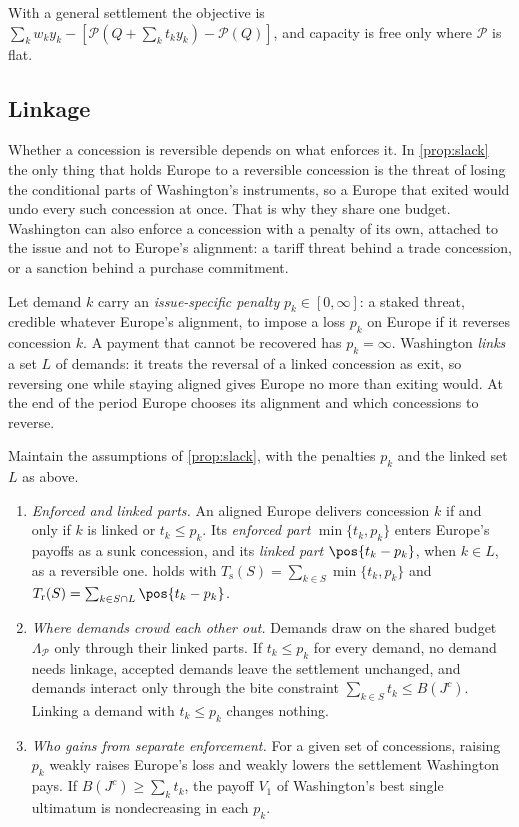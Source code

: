 With a general settlement the objective is $\sum_k w_ky_k-[\mathcal P(Q+\sum_kt_ky_k)-\mathcal P(Q)]$, and capacity is free only where $\mathcal P$ is flat.

\subsection{Linkage}\label{sec:linkage}

Whether a concession is reversible depends on what enforces it. In \cref{prop:slack} the only thing that holds Europe to a reversible concession is the threat of losing the conditional parts of Washington's instruments, so a Europe that exited would undo every such concession at once. That is why they share one budget. Washington can also enforce a concession with a penalty of its own, attached to the issue and not to Europe's alignment: a tariff threat behind a trade concession, or a sanction behind a purchase commitment.

Let demand $k$ carry an \emph{issue-specific penalty} $p_k\in[0,\infty]$: a staked threat, credible whatever Europe's alignment, to impose a loss $p_k$ on Europe if it reverses concession $k$. A payment that cannot be recovered has $p_k=\infty$. Washington \emph{links} a set $L$ of demands: it treats the reversal of a linked concession as exit, so reversing one while staying aligned gives Europe no more than exiting would. At the end of the period Europe chooses its alignment and which concessions to reverse.

\begin{proposition}[Linkage]\label{prop:linkage}
Maintain the assumptions of \cref{prop:slack}, with the penalties $p_k$ and the linked set $L$ as above.
\begin{enumerate}[label=(\alph*)]
\item \emph{Enforced and linked parts.} An aligned Europe delivers concession $k$ if and only if $k$ is linked or $t_k\le p_k$. Its \emph{enforced part} $\min\{t_k,p_k\}$ enters Europe's payoffs as a sunk concession, and its \emph{linked part} $\pos{t_k-p_k}$, when $k\in L$, as a reversible one.  holds with $T_{\mathrm s}(S)=\sum_{k\in S}\min\{t_k,p_k\}$ and $T_{\mathrm r}(S)=\sum_{k\in S\cap L}\pos{t_k-p_k}$.
\item \emph{Where demands crowd each other out.} Demands draw on the shared budget $\Lambda_{\mathcal P}$ only through their linked parts. If $t_k\le p_k$ for every demand, no demand needs linkage, accepted demands leave the settlement unchanged, and demands interact only through the bite constraint $\sum_{k\in S}t_k\le B(J^c)$. Linking a demand with $t_k\le p_k$ changes nothing.
\item \emph{Who gains from separate enforcement.} For a given set of concessions, raising $p_k$ weakly raises Europe's loss and weakly lowers the settlement Washington pays. If $B(J^c)\ge\sum_k t_k$, the payoff $V_1$ of Washington's best single ultimatum is nondecreasing in each $p_k$.
\end{enumerate}
\end{proposition}

